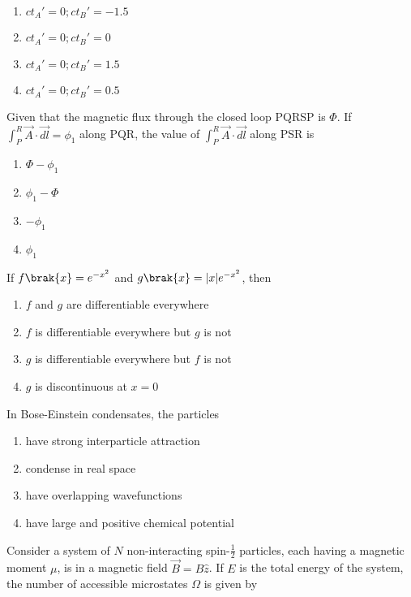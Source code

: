 \begin{enumerate}
    \item $ct_A' = 0; ct_B' = -1.5$
    \item $ct_A' = 0; ct_B' = 0$
    \item $ct_A' = 0; ct_B' = 1.5$
    \item $ct_A' = 0; ct_B' = 0.5$
\end{enumerate}

\item Given that the magnetic flux through the closed loop PQRSP is $\Phi$. If $\int_P^R \vec{A} \cdot \vec{dl} = \phi_1$ along PQR, the value of $\int_P^R \vec{A} \cdot \vec{dl}$ along PSR is

\begin{enumerate}
    \item $\Phi - \phi_1$
    \item $\phi_1 - \Phi$
    \item $-\phi_1$
    \item $\phi_1$
\end{enumerate}

\item If $f\brak{x} = e^{-x^2}$ and $g\brak{x} = |x|e^{-x^2}$, then

\begin{enumerate}
    \item $f$ and $g$ are differentiable everywhere
    \item $f$ is differentiable everywhere but $g$ is not
    \item $g$ is differentiable everywhere but $f$ is not
    \item $g$ is discontinuous at $x=0$
\end{enumerate}

\item In Bose-Einstein condensates, the particles

\begin{enumerate}
    \item have strong interparticle attraction
    \item condense in real space
    \item have overlapping wavefunctions
    \item have large and positive chemical potential
\end{enumerate}


\item Consider a system of $N$ non-interacting spin-$\frac{1}{2}$ particles, each having a magnetic moment $\mu$, is in a magnetic field $\vec{B} = B\hat{z}$. If $E$ is the total energy of the system, the number of accessible microstates $\Omega$ is given  
 by

